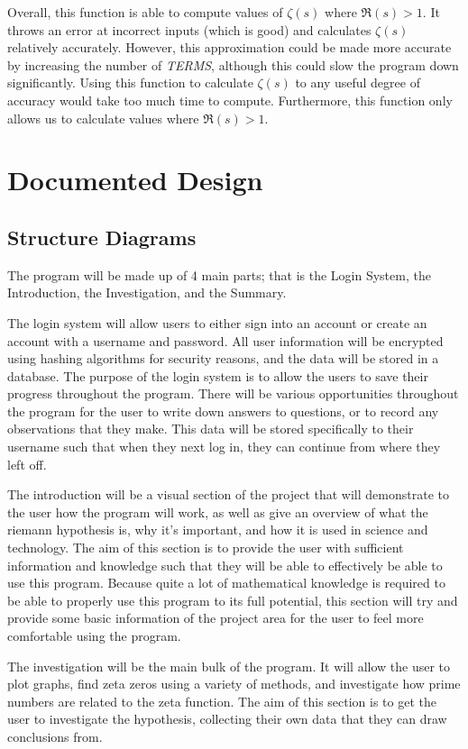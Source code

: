 \documentclass[12pt]{article}
\begin{document}
Overall, this function is able to compute values of $\zeta(s)$ where $\Re(s) > 1$. It throws an error at incorrect inputs (which is good) and calculates $\zeta(s)$ relatively accurately. However, this approximation could be made more accurate by increasing the number of \textit{TERMS}, although this could slow the program down significantly. Using this function to calculate $\zeta(s)$ to any useful degree of accuracy would take too much time to compute. Furthermore, this function only allows us to calculate values where $\Re(s) > 1$.

\clearpage
\section{Documented Design}

\subsection{Structure Diagrams}

The program will be made up of 4 main parts; that is the Login System, the Introduction, the Investigation, and the Summary.

The login system will allow users to either sign into an account or create an account with a username and password. All user information will be encrypted using hashing algorithms for security reasons, and the data will be stored in a database. The purpose of the login system is to allow the users to save their progress throughout the program. There will be various opportunities throughout the program for the user to write down answers to questions, or to record any observations that they make. This data will be stored specifically to their username such that when they next log in, they can continue from where they left off.

The introduction will be a visual section of the project that will demonstrate to the user how the program will work, as well as give an overview of what the riemann hypothesis is, why it's important, and how it is used in science and technology. The aim of this section is to provide the user with sufficient information and knowledge such that they will be able to effectively be able to use this program. Because quite a lot of mathematical knowledge is required to be able to properly use this program to its full potential, this section will try and provide some basic information of the project area for the user to feel more comfortable using the program.

The investigation will be the main bulk of the program. It will allow the user to plot graphs, find zeta zeros using a variety of methods, and investigate how prime numbers are related to the zeta function. The aim of this section is to get the user to investigate the hypothesis, collecting their own data that they can draw conclusions from.
\end{document}

